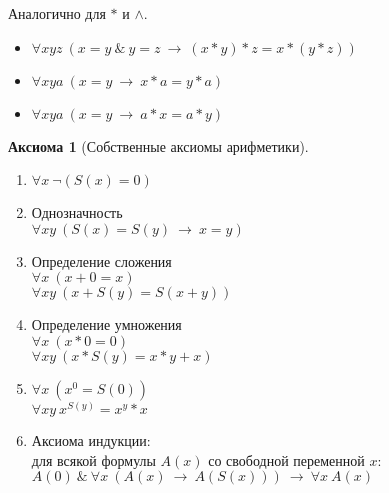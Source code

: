\documentclass[a4paper,12pt]{article}
\theoremstyle{definition} %
\newtheorem{axiom}{Аксиома}[section]
\theoremstyle{definition} %
\theoremstyle{remark} %
\begin{document}
	Аналогично для $*$ и $\wedge$.
	
	\begin{itemize}
		\item $\forall xyz \ (x = y \ \& \ y = z \ \rightarrow \ (x * y) * z = x * (y * z))$
		\item $\forall xya \ (x = y \ \rightarrow \ x * a = y * a)$
		\item $\forall xya \ (x = y \ \rightarrow \ a * x = a * y)$
	\end{itemize}

	\begin{axiom}[Собственные аксиомы арифметики]\
		\begin{enumerate}
			\item $\forall x \ \neg (S(x) = 0)$
			\item Однозначность \\[1ex]
			$\forall xy \ (S(x) = S(y) \ \rightarrow \ x = y)$
			\item Определение сложения \\[1ex]
			$\forall x \ (x + 0 = x)$ \\[1ex]
			$\forall xy \ (x + S(y) = S(x + y))$
			\item Определение умножения \\[1ex]
			$\forall x \ (x * 0 = 0)$ \\[1ex]
			$\forall xy \ (x * S(y) = x * y + x)$
			\item $\forall x \ (x^0 = S(0))$ \\[1ex]
			$\forall xy \ x^{S(y)} = x^y * x$
			\item Аксиома индукции: \\[1ex]
			для всякой формулы $A(x)$ со свободной переменной $x$: \\[1ex]
			$A(0) \ \& \ \forall x \ (A(x) \ \rightarrow \ A(S(x))) \ \rightarrow \ \forall x \ A(x)$
		\end{enumerate}
	\end{axiom}
\end{document}
